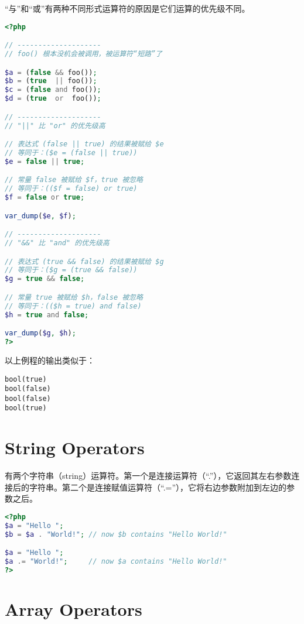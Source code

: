 “与”和“或”有两种不同形式运算符的原因是它们运算的优先级不同。

\begin{lstlisting}[language=PHP]
<?php

// --------------------
// foo() 根本没机会被调用，被运算符“短路”了

$a = (false && foo());
$b = (true  || foo());
$c = (false and foo());
$d = (true  or  foo());

// --------------------
// "||" 比 "or" 的优先级高

// 表达式 (false || true) 的结果被赋给 $e
// 等同于：($e = (false || true))
$e = false || true;

// 常量 false 被赋给 $f，true 被忽略
// 等同于：(($f = false) or true)
$f = false or true;

var_dump($e, $f);

// --------------------
// "&&" 比 "and" 的优先级高

// 表达式 (true && false) 的结果被赋给 $g
// 等同于：($g = (true && false))
$g = true && false;

// 常量 true 被赋给 $h，false 被忽略
// 等同于：(($h = true) and false)
$h = true and false;

var_dump($g, $h);
?>
\end{lstlisting}

以上例程的输出类似于：

\begin{verbatim}
bool(true)
bool(false)
bool(false)
bool(true)
\end{verbatim}

\section{String Operators}


有两个字符串（string）运算符。第一个是连接运算符（“.”），它返回其左右参数连接后的字符串。第二个是连接赋值运算符（“.=”），它将右边参数附加到左边的参数之后。

\begin{lstlisting}[language=PHP]
<?php
$a = "Hello ";
$b = $a . "World!"; // now $b contains "Hello World!"

$a = "Hello ";
$a .= "World!";     // now $a contains "Hello World!"
?>
\end{lstlisting}

\section{Array Operators}


